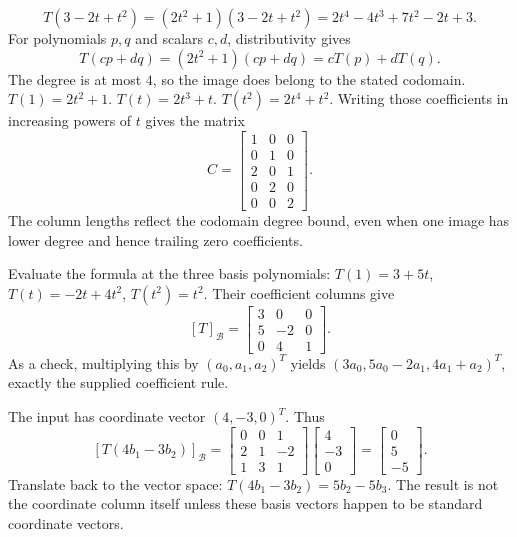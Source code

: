 \[T(3-2t+t^2)=(2 t^{2} + 1)(3-2t+t^2)=2 t^{4} - 4 t^{3} + 7 t^{2} - 2 t + 3.\]
For polynomials $p,q$ and scalars $c,d$, distributivity gives
\[T(cp+dq)=(2 t^{2} + 1)(cp+dq)=cT(p)+dT(q).\]
The degree is at most $4$, so the image does belong to the stated codomain.
$T(1)=2 t^{2} + 1$. $T(t)=2 t^{3} + t$. $T(t^{2})=2 t^{4} + t^{2}$.
Writing those coefficients in increasing powers of $t$ gives the matrix
\[C=\begin{bmatrix}1&0&0\\0&1&0\\2&0&1\\0&2&0\\0&0&2\end{bmatrix}.\]
The column lengths reflect the codomain degree bound, even when one image has lower degree and hence trailing zero coefficients.

Evaluate the formula at the three basis polynomials: $T(1)=3+5t$, $T(t)=-2t+4t^2$, $T(t^2)=t^2$. Their coefficient columns give
\[
[T]_{\mathcal B}=\begin{bmatrix}3&0&0\\5&-2&0\\0&4&1\end{bmatrix}.
\]
As a check, multiplying this by $(a_0,a_1,a_2)^T$ yields $(3a_0,5a_0-2a_1,4a_1+a_2)^T$, exactly the supplied coefficient rule.

The input has coordinate vector $(4,-3,0)^T$. Thus
\[
[T(4b_1-3b_2)]_{\mathcal B}
=\begin{bmatrix}0&0&1\\2&1&-2\\1&3&1\end{bmatrix}
\begin{bmatrix}4\\-3\\0\end{bmatrix}
=\begin{bmatrix}0\\5\\-5\end{bmatrix}.
\]
Translate back to the vector space: $T(4b_1-3b_2)=5b_2-5b_3$. The result is not the coordinate column itself unless these basis vectors happen to be standard coordinate vectors.

